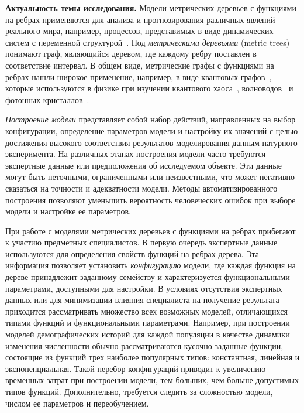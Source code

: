 

\textbf{Актуальность темы исследования.} 
Модели метрических деревьев с функциями на ребрах применяются для анализа и прогнозирования различных явлений реального мира, например, процессов, представимых в виде динамических систем с переменной структурой~\cite{кириллов2009динамические, aldous1993continuum}.
Под \textit{метрическими деревьями} (metric trees) понимают граф, являющийся деревом, где каждому ребру поставлен в соответствие интервал.
В общем виде, метрические графы с функциями на ребрах нашли широкое применение, например, в виде квантовых графов~\cite{berkolaiko2013introduction}, которые используются в физике при изучении квантового хаоса~\cite{kottos1997quantum}, волноводов~\cite{exner2015quantum} и фотонных кристаллов~\cite{kuchment2002differential}.

\textit{Построение модели} представляет собой набор действий, направленных на выбор конфигурации, определение параметров модели и настройку их значений с целью достижения высокого соответствия результатов моделирования данным натурного эксперимента.
На различных этапах построения модели часто требуются экспертные данные или предположения об исследуемом объекте. Эти данные могут быть неточными, ограниченными или неизвестными, что может негативно сказаться на точности и адекватности модели.
Методы автоматизированного построения позволяют уменьшить вероятность человеческих ошибок при выборе модели и настройке ее параметров.

При работе с моделями метрических деревьев с функциями на ребрах прибегают к участию предметных специалистов.
В первую очередь экспертные данные используются для определения свойств функций на ребрах дерева.
Эта информация позволяет установить \textit{конфигурацию} модели, где каждая функция на дереве принадлежит заданному семейству и характеризуется функциональными параметрами, доступными для настройки.
В условиях отсутствия экспертных данных или для минимизации влияния специалиста на получение результата приходится рассматривать множество всех возможных моделей, отличающихся типами функций и функциональными параметрами.
Например, при построении моделей демографических историй для каждой популяции в качестве динамики изменения численности обычно рассматриваются кусочно-заданные функции, состоящие из функций трех наиболее популярных типов: константная, линейная и экспоненциальная.
Такой перебор конфигураций приводит к увеличению временных затрат при построении модели, тем больших, чем больше допустимых типов функций.
Дополнительно, требуется следить за сложностью модели, числом ее параметров и переобучением.


